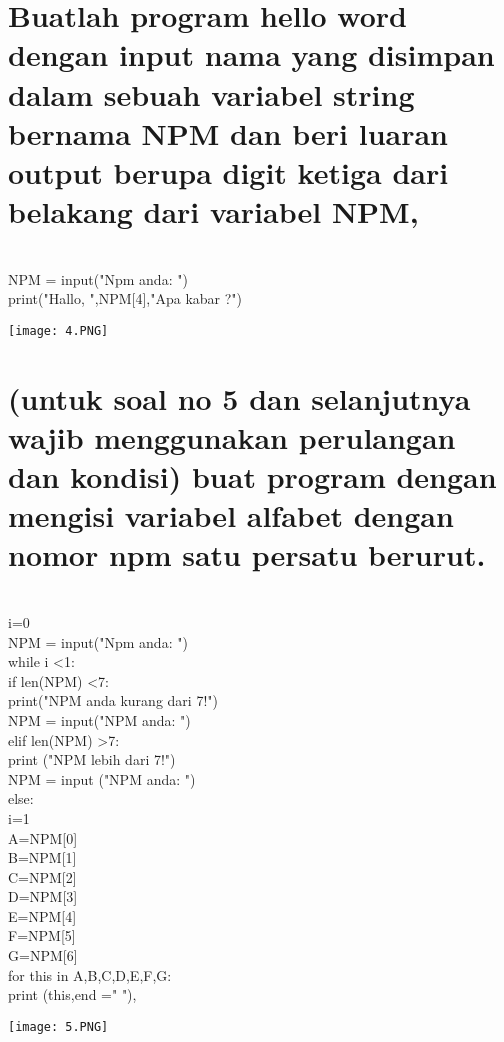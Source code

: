 \documentclass{article}
\begin{document}
\section{Buatlah program hello word dengan input nama yang disimpan dalam sebuah variabel string bernama NPM dan beri luaran output berupa digit ketiga dari belakang dari variabel NPM,}\\
NPM = input("Npm anda: ")\\
print("Hallo, ",NPM[4],"Apa kabar ?")\\
\begin{center}
    \texttt{[image: 4.PNG]}
\end{center}

\section{(untuk soal no 5 dan selanjutnya wajib menggunakan perulangan dan kondisi) buat program dengan mengisi variabel alfabet dengan nomor npm satu persatu berurut.} \\
i=0 \\
NPM = input("Npm anda: ")\\
while i <1:\\
    if len(NPM) <7:\\
        print("NPM anda kurang dari 7!")\\
        NPM = input("NPM anda: ")\\
    elif len(NPM) >7:\\
        print ("NPM lebih dari 7!")\\
        NPM = input ("NPM anda: ")\\
    else:\\
        i=1\\

A=NPM[0]\\
B=NPM[1]\\
C=NPM[2]\\
D=NPM[3]\\
E=NPM[4]\\
F=NPM[5]\\
G=NPM[6]\\

for this in A,B,C,D,E,F,G:\\
    print (this,end =" "),\\
\begin{center}
    \texttt{[image: 5.PNG]}
\end{center}
\end{document}

